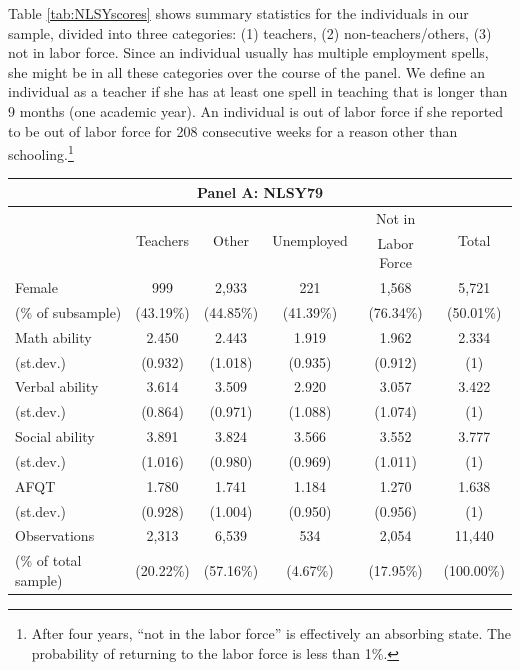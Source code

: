 \documentclass[onehalfspacing,11pt]{article}
\begin{document}
	Table \ref{tab:NLSYscores} shows summary statistics for the individuals in our sample, divided into three categories: (1) teachers, (2) non-teachers/others, (3) not in labor force. Since an individual usually has multiple employment spells, she might be in all these categories over the course of the panel. We define an individual as a teacher if she has at least one spell in teaching that is longer than 9 months (one academic year). An individual is out of labor force if she reported to be out of labor force for 208 consecutive weeks for a reason other than schooling.\footnote{After four years, ``not in the labor force'' is effectively an absorbing state. The probability of returning to the labor force is less than 1\%.}
	
	\begin{table}[h!]
		\centering
		\begin{tabular}{lccccc}
			\toprule
			\multicolumn{6}{c}{Panel A: NLSY79}\\
			\midrule
			& \multirow{2}{*}{Teachers} & \multirow{2}{*}{Other} & \multirow{2}{*}{Unemployed} & Not in & \multirow{2}{*}{Total}\\
			& &  &  & Labor Force & \\
			\midrule
			Female & 999 & 2,933 & 221 & 1,568 & 5,721\\
			\quad (\% of subsample) & (43.19\%) & (44.85\%) & (41.39\%) & (76.34\%) & (50.01\%)\\
			\midrule
			Math ability & 2.450 & 2.443 & 1.919 & 1.962 & 2.334\\
			\quad (st.dev.) & (0.932) & (1.018) & (0.935) & (0.912) & (1)\\
			\midrule
			Verbal ability & 3.614 & 3.509 & 2.920 & 3.057 &  3.422\\
			\quad (st.dev.) & (0.864) & (0.971) & (1.088) & (1.074) & (1)\\
			\midrule
			Social ability & 3.891 & 3.824 & 3.566 & 3.552 & 3.777\\
			\quad (st.dev.) & (1.016) & (0.980) & (0.969) & (1.011) & (1)\\
			\midrule
			AFQT & 1.780 &  1.741 & 1.184 & 1.270 & 1.638\\
			\quad (st.dev.) & (0.928) & (1.004) & (0.950) & (0.956) & (1)\\
			\midrule
			Observations &  2,313 & 6,539 &  534 & 2,054 & 11,440\\
			\quad (\% of total sample) & (20.22\%) & (57.16\%) & (4.67\%) & (17.95\%) & (100.00\%)\\

\end{tabular}
\end{table}
\end{document}
